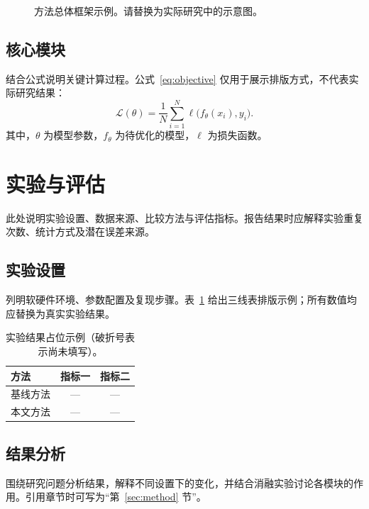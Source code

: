 \documentclass[conference]{IEEEtran}
\begin{document}
\begin{figure}[!t]
  \centering
  \caption{方法总体框架示例。请替换为实际研究中的示意图。}
  \label{fig:framework}
\end{figure}

\subsection{核心模块}
结合公式说明关键计算过程。公式~\eqref{eq:objective} 仅用于展示排版方式，不代表实际研究结果：
\begin{equation}
  \mathcal{L}(\theta)=\frac{1}{N}\sum_{i=1}^{N}
  \ell\bigl(f_{\theta}(x_i),y_i\bigr).
  \label{eq:objective}
\end{equation}
其中，$\theta$ 为模型参数，$f_{\theta}$ 为待优化的模型，$\ell$ 为损失函数。

\section{实验与评估}
\label{sec:evaluation}
此处说明实验设置、数据来源、比较方法与评估指标。报告结果时应解释实验重复次数、统计方式及潜在误差来源。

\subsection{实验设置}
列明软硬件环境、参数配置及复现步骤。表~\ref{tab:results} 给出三线表排版示例；所有数值均应替换为真实实验结果。

\begin{table}[!t]
  \caption{实验结果占位示例（破折号表示尚未填写）。}
  \label{tab:results}
  \centering
  \renewcommand{\arraystretch}{1.2}
  \begin{tabular}{lcc}
    \toprule
    方法 & 指标一 & 指标二 \\
    \midrule
    基线方法 & --- & --- \\
    本文方法 & --- & --- \\
    \bottomrule
  \end{tabular}
\end{table}

\subsection{结果分析}
围绕研究问题分析结果，解释不同设置下的变化，并结合消融实验讨论各模块的作用。引用章节时可写为“第~\ref{sec:method} 节”。
\end{document}
